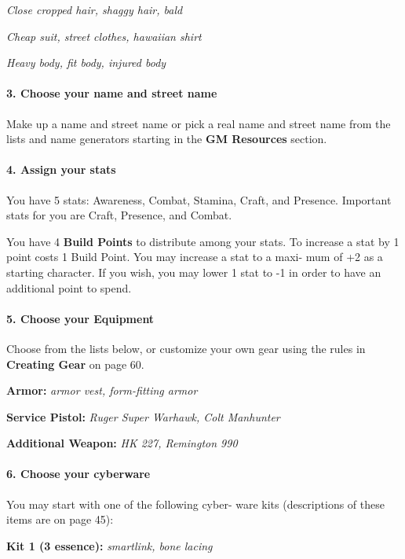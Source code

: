 \begin{multicols}{3}
\textit{Close cropped hair, shaggy hair, bald}

\textit{Cheap suit, street clothes, hawaiian shirt}

\textit{Heavy body, fit body, injured body}

\paragraph{3.  Choose your name and street name}

Make up a name and street name or pick a real
name and street name from the lists and name
generators starting in the \textbf{GM Resources} section.

\paragraph{4.  Assign your stats}

You have 5 stats: Awareness, Combat, Stamina,
Craft, and Presence. Important stats for you are
Craft, Presence, and Combat.

You have 4 \textbf{Build Points} to distribute among
your stats. To increase a stat by 1 point costs 1
Build Point. You may increase a stat to a maxi-
mum of +2 as a starting character. If you wish,
you may lower 1 stat to -1 in order to have an
additional point to spend.

\paragraph{5.  Choose your Equipment}

Choose from the lists below, or customize your
own gear using the rules in \textbf{Creating Gear} on
page 60.

\textbf{Armor:} \textit{armor vest, form-fitting armor}

\textbf{Service Pistol:} \textit{Ruger Super Warhawk, Colt
Manhunter}

\textbf{Additional Weapon:} \textit{HK 227,
  Remington 990}

\paragraph{6.  Choose your cyberware}

You may start with one of the following cyber-
ware kits (descriptions of these items are on
page 45):

\textbf{Kit 1 (3 essence):} \textit{smartlink, bone lacing}


\end{multicols}
